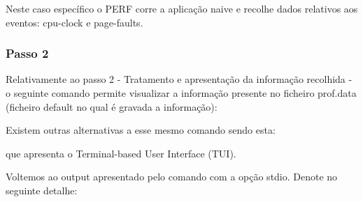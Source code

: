 \documentclass[conference,compsoc]{IEEEtran}
\begin{document}
  Neste caso específico o PERF corre a aplicação naive e recolhe dados relativos aos eventos: cpu-clock e page-faults. 


  \subsubsection{Passo 2}
  \par 
  Relativamente ao passo 2 - Tratamento e apresentação da informação recolhida - o seguinte comando permite visualizar a informação presente no ficheiro prof.data (ficheiro default no qual é gravada a informação): \par 



                                                                                                                                                                                                                       Existem outras alternativas a esse mesmo comando sendo esta:


                                                                                                                                                                                                                       que apresenta o Terminal-based User Interface (TUI).\par 
                                                                                                                                                                                                                       Voltemos ao output apresentado pelo comando com a opção \-\-stdio. Denote no seguinte detalhe:
\end{document}
